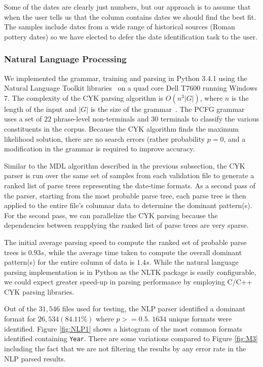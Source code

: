 Some of the dates are clearly just numbers, but our approach is to assume that when the user tells us that the column contains dates we should find the best fit. The samples include dates from a wide range of historical sources (\eg Roman pottery dates) so we have elected to defer the date identification task to the user.

\subsubsection{Natural Language Processing}


We implemented the grammar, training and parsing in Python 3.4.1 using the Natural Language Toolkit libraries~\cite{nltk} on a quad core Dell T7600 running Windows 7. The complexity of the CYK parsing algorithm is $O(n^{3}|G|)$, where $n$ is the length of the input and $|G|$ is the size of the grammar~\cite{Younger67}. The PCFG grammar uses a set of $22$ phrase-level non-terminals and $30$ terminals to classify the various constituents in the corpus. Because the CYK algorithm finds the maximum likelihood solution, there are no search errors (rather probability $p = 0$, and a modification in the grammar is required to improve accuracy.

Similar to the MDL algorithm described in the previous subsection, the CYK parser is run over the same set of samples from each validation file to generate a ranked list of parse trees representing the date-time formats. As a second pass of the parser, starting from the most probable parse tree, each parse tree is then applied to the entire file's columnar data to determine the dominant pattern(s). For the second pass, we can parallelize the CYK parsing because the dependencies between reapplying the ranked list of parse trees are very sparse.

The initial average parsing speed to compute the ranked set of probable parse trees is $0.93s$, while the average time taken to compute the overall dominant pattern(s) for the entire column of data is $1.4s$. While the natural language parsing implementation is in Python as the NLTK package is easily configurable, we could expect greater speed-up in parsing performance by employing C/C++ CYK parsing libraries.


Out of the $31,546$ files used for testing, the NLP parser identified a dominant format for $26, 534 (84.11\%)$ where $p >= 0.5$. $1634$ unique formats were identified. Figure \ref{fig:NLP1} shows a histogram of the most common formats identified containing \texttt{Year}. There are some variations compared to Figure \ref{fig:M3} including the fact that we are not filtering the results by any error rate in the NLP parsed results.

